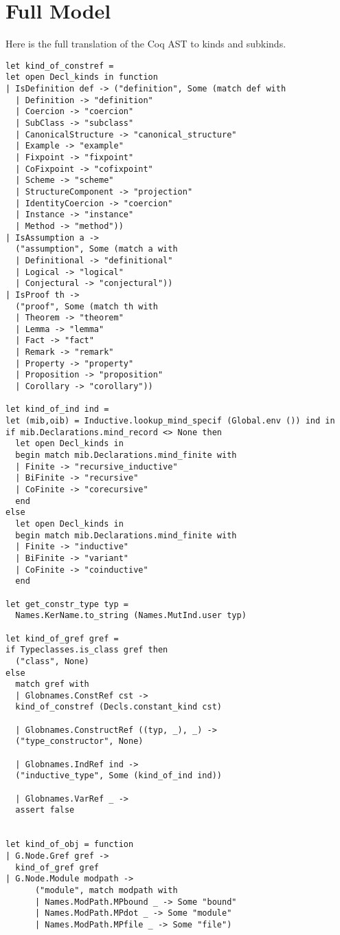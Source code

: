\chapter{Full Model}\label{chapter:fullmodel}

Here is the full translation of the Coq AST to kinds and subkinds.

\begin{verbatim}
let kind_of_constref =
let open Decl_kinds in function
| IsDefinition def -> ("definition", Some (match def with
  | Definition -> "definition"
  | Coercion -> "coercion"
  | SubClass -> "subclass"
  | CanonicalStructure -> "canonical_structure"
  | Example -> "example"
  | Fixpoint -> "fixpoint"
  | CoFixpoint -> "cofixpoint"
  | Scheme -> "scheme"
  | StructureComponent -> "projection"
  | IdentityCoercion -> "coercion"
  | Instance -> "instance"
  | Method -> "method"))
| IsAssumption a ->
  ("assumption", Some (match a with
  | Definitional -> "definitional"
  | Logical -> "logical"
  | Conjectural -> "conjectural"))
| IsProof th ->
  ("proof", Some (match th with
  | Theorem -> "theorem"
  | Lemma -> "lemma"
  | Fact -> "fact"
  | Remark -> "remark"
  | Property -> "property"
  | Proposition -> "proposition"
  | Corollary -> "corollary"))

let kind_of_ind ind =
let (mib,oib) = Inductive.lookup_mind_specif (Global.env ()) ind in
if mib.Declarations.mind_record <> None then
  let open Decl_kinds in
  begin match mib.Declarations.mind_finite with
  | Finite -> "recursive_inductive"
  | BiFinite -> "recursive"
  | CoFinite -> "corecursive"
  end
else
  let open Decl_kinds in
  begin match mib.Declarations.mind_finite with
  | Finite -> "inductive"
  | BiFinite -> "variant"
  | CoFinite -> "coinductive"
  end

let get_constr_type typ =
  Names.KerName.to_string (Names.MutInd.user typ)

let kind_of_gref gref = 
if Typeclasses.is_class gref then
  ("class", None)
else
  match gref with
  | Globnames.ConstRef cst ->
  kind_of_constref (Decls.constant_kind cst)

  | Globnames.ConstructRef ((typ, _), _) -> 
  ("type_constructor", None)

  | Globnames.IndRef ind -> 
  ("inductive_type", Some (kind_of_ind ind))

  | Globnames.VarRef _ ->
  assert false


let kind_of_obj = function
| G.Node.Gref gref -> 
  kind_of_gref gref
| G.Node.Module modpath ->
      ("module", match modpath with
      | Names.ModPath.MPbound _ -> Some "bound"
      | Names.ModPath.MPdot _ -> Some "module"
      | Names.ModPath.MPfile _ -> Some "file")
\end{verbatim}
